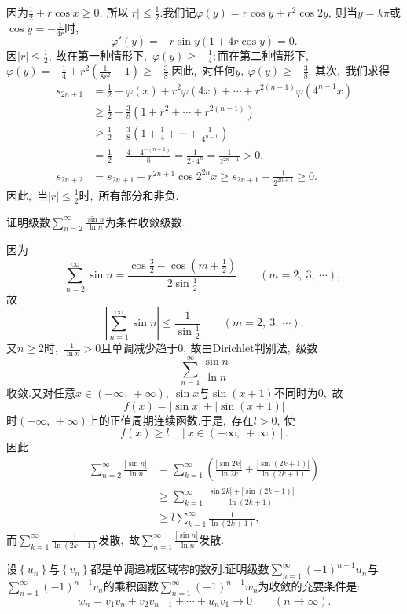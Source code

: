 	\begin{solution}
		因为$\frac{1}{2}+r\cos x\ge 0,\ $所以$|r|\le\frac{1}{2}.$我们记$\varphi(y)=r\cos y+r^2\cos 2y,\ $则当$y=k\pi$或$\cos y=-\frac{1}{4r}$时,\ 
		$$\varphi'(y)=-r\sin y(1+4r\cos y)=0.$$
		因$|r|\le\frac{1}{2},\ $故在第一种情形下,\ $\varphi(y)\ge-\frac{1}{4};$而在第二种情形下,\ $\varphi(y)=-\frac{1}{4}+r^2\left(\frac{1}{8r^2}-1\right)\ge-\frac{3}{8}.$因此,\ 对任何$y,\ \varphi(y)\ge-\frac{3}{8}.$
		其次,\ 我们求得
		\begin{align*}
			s_{2n+1}&=\frac{1}{2}+\varphi(x)+r^2\varphi(4x)+\cdots+r^{2(n-1)}\varphi(4^{n-1}x)\\
			&\ge\frac{1}{2}-\frac{3}{8}(1+r^2+\cdots+r^{2(n-1)})\\
			&\ge\frac{1}{2}-\frac{3}{8}\left(1+\frac{1}{4}+\cdots+\frac{1}{4^{n-1}}\right)\\
			&=\frac{1}{2}-\frac{4-4^{-(n+1)}}{8}=\frac{1}{2\cdot4^n}=\frac{1}{2^{2n+1}}>0.\\
			s_{2n+2}&=s_{2n+1}+r^{2n+1}\cos2^{2n}x\ge s_{2n+1}-\frac{1}{2^{2n+1}}\ge 0.
		\end{align*}
		因此,\ 当$|r|\le\frac{1}{2}$时,\ 所有部分和非负. 
	\end{solution}
	\newpage
	\begin{problem}
		证明级数$\sum\limits_{n=2}^{\infty}\frac{\sin n}{\ln n}$为条件收敛级数.
	\end{problem}
	
	\begin{solution}
		因为
		$$\sum\limits_{n=2}^{\infty}\sin n=\frac{\cos\frac{3}{2}-\cos\left(m+\frac{1}{2}\right)}{2\sin\frac{1}{2}}\qquad(m=2,\ 3,\ \cdots),\ $$
		故
		$$\left|\sum\limits_{n=1}^{\infty}\sin n\right|\le\frac{1}{\sin\frac{1}{2}}\qquad(m=2,\ 3,\ \cdots).$$
		又$n\ge 2$时,\ $\frac{1}{\ln n}>0$且单调减少趋于$0,\ $故由Dirichlet判别法,\ 级数
		$$\sum\limits_{n=1}^{\infty}\frac{\sin n}{\ln n}$$
		收敛.又对任意$x\in\left(-\infty,\ +\infty\right),\ \sin x$与$\sin(x+1)$不同时为$0$,\ 故
		$$f(x)=|\sin x|+|\sin (x+1)|$$
		时$\left(-\infty,\ +\infty\right)$上的正值周期连续函数.于是,\ 存在$l>0,\ $使
		$$f(x)\ge l\quad \left[x\in\left(-\infty,\ +\infty\right)\right].$$
		因此
		\begin{align*}
			\sum\limits_{n=2}^{\infty}\frac{|\sin n|}{\ln n}&=\sum\limits_{k=1}^{\infty}\left(\frac{|\sin 2k|}{\ln 2k}+\frac{|\sin (2k+1)|}{\ln(2k+1)}\right)\\
			&\ge\sum\limits_{k=1}^{\infty}\frac{|\sin 2k|+|\sin (2k+1)|}{\ln (2k+1)}\\
			&\ge l\sum\limits_{k=1}^{\infty}\frac{1}{\ln(2k+1)},\ 
		\end{align*}
		而$\sum\limits_{k=1}^{\infty}\frac{1}{\ln(2k+1)}$发散,\ 故$\sum\limits_{n=1}^{\infty}\frac{|\sin n|}{\ln n}$发散. 
	\end{solution}
	\newpage
	\begin{problem}
		设$\left\{u_n\right\}$与$\left\{v_n\right\}$都是单调递减区域零的数列.证明级数$\sum\limits_{n=1}^{\infty}(-1)^{n-1}u_n$与$\sum\limits_{n=1}^{\infty}(-1)^{n-1}v_n$的乘积函数$\sum\limits_{n=1}^{\infty}(-1)^{n-1}w_n$为收敛的充要条件是:
		$$w_n=v_1v_n+v_2v_{n-1}+\cdots+u_nv_1\rightarrow0\qquad(n\rightarrow\infty).$$
	\end{problem}
	
